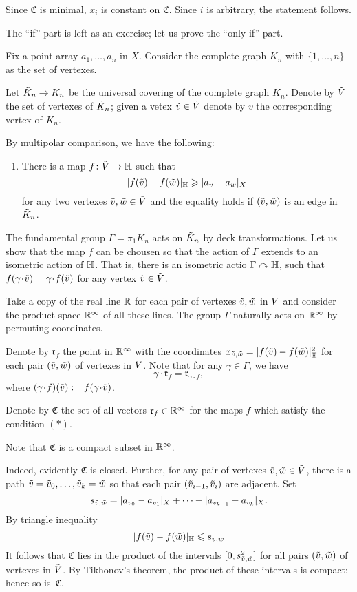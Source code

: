 Since $\mathfrak{C}$ is minimal, $x_i$ is constant on $\mathfrak{C}$.
Since $i$ is arbitrary, the statement follows.
\qeds


The ``if'' part is left as an exercise;
let us prove the ``only if'' part.

Fix a point array $a_1,\dots, a_n$ in $X$.
Consider the complete graph $K_n$ with $\{1,\dots,n\}$ as the set of vertexes.


Let $\~ K_n\to K_n$ be the universal covering of the complete graph $K_n$.
Denote by $\~ V$ the set of vertexes of $\~ K_n$;
given a vetex $\~ v\in\~V$ denote by $v$ the corresponding vertex of $K_n$.

By multipolar comparison, we have the following:

\begin{enumerate}[$({*})$]
\item There is a map $f\:\~V\to\HH$ such that 
\[|f(\~v)-f(\~w)|_\HH\ge |a_v-a_w|_X\]
for any two vertexes $\~v,\~w\in \~ V$ and the equality holds if $(\~v,\~w)$ is an edge in $\~ K_n$.
\end{enumerate}

The fundamental group $\Gamma=\pi_1K_n$ acts on $\~ K_n$ by deck transformations.
Let us show that the map $f$ can be chousen so that the action of $\Gamma$ extends to an isometric action of $\HH$.
That is, there is an isometric actio $\Gamma\acts \HH$, such that $f(\gamma\cdot \~v)=\gamma\cdot f(\~v)$ for any vertex $\~v\in\~V$. %

Take a copy of the real line $\RR$ for each pair of vertexes $\~v,\~w$ in $\~V$ and
consider the product space $\RR^\infty$ of all these lines. 
The group $\Gamma$ naturally acts on $\RR^\infty$ by permuting coordinates.

Denote by $\mathfrak{r}_f$ the point in $\RR^\infty$ with the coordinates $x_{\~v,\~w}=|f(\~v)-f(\~w)|_\HH^2$ for each pair $(\~v,\~w)$ of vertexes in $\~V$.
Note that for any $\gamma\in\Gamma$, we have
\[\gamma\cdot\mathfrak{r}_f=\mathfrak{r}_{\gamma\cdot f},\]
where $(\gamma\cdot f)(\~v):= f(\gamma\cdot \~v)$.
 
Denote by $\mathfrak{C}$ the set of all vectors $\mathfrak{r}_f\in\RR^\infty$ for the maps $f$ which satisfy the condition $({*})$.

Note that $\mathfrak{C}$ is a compact subset in $\RR^\infty$.

Indeed, evidently $\mathfrak{C}$ is closed.
Further, for any pair of vertexes $\~v,\~w\in\~V$, there is a path $\~v=\~v_0,\dots,\~v_k=\~w$ so that each pair $(\~v_{i-1},\~v_i)$ are adjacent.
Set 
\[s_{\~v,\~w}=|a_{v_0}-a_{v_1}|_X+\dots+|a_{v_{k-1}}-a_{v_k}|_X.\]
By triangle inequality 
\[|f(\~v)-f(\~w)|_\HH\le s_{v,w}\]
It follows that $\mathfrak{C}$ lies in the product of the intervals $[0,s_{\~v,\~w}^2]$
for all pairs $(\~v,\~w)$ of vertexes in $\~V$.
By Tikhonov's theorem, the product of these intervals is compact;
hence so is~$\mathfrak{C}$.


